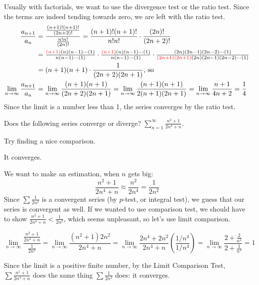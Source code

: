 \begin{solution}
Usually with factorials, we want to use the divergence test or the ratio test. Since the terms are indeed tending towards zero, we are left with the ratio test.
\begin{align*}
\frac{a_{n+1}}{a_n}&=\frac{\frac{(n+1)!(n+1)!}{(2n+2)!}}{\frac{n!n!}{(2n)!}}=\frac{(n+1)!(n+1)!}{n!n!}\cdot\frac{(2n)!}{(2n+2)!}\\
&=\tfrac{\textcolor{red}{(n+1)}{(n)}{(n-1)}\cdots{(1)}}{{n}{(n-1)}\cdots{(1)}}
\cdot\tfrac{\textcolor{red}{(n+1)}{(n)}{(n-1)}\cdots{(1)}}{{n}{(n-1)}\cdots{(1)}}
\cdot
\tfrac{{(2n)}{(2n-1)}{(2n-2)}\cdots{(1)}}{\textcolor{red}{(2n+1)(2n+1)}{(2n)}{(2n-1)}{(2n-2)}\cdots{(1)}}
\\
&=(n+1)(n+1) \cdot \frac{1}{(2n+2)(2n+1)}\mbox{, so}\\
\lim_{n \rightarrow \infty}\frac{a_{n+1}}{a_n}&=\lim_{n \rightarrow \infty}\frac{(n+1)(n+1)}{(2n+2)(2n+1)}
=\lim_{n \rightarrow \infty}\frac{(n+1)(n+1)}{2(n+1)(2n+1)}
=\lim_{n \rightarrow \infty}\frac{n+1}{4n+2}=\frac{1}{4}
\end{align*}
Since the limit is a number less than 1, the series converges by the ratio test.
\end{solution}












\begin{Mquestion}
Does the following series converge or diverge?
$\displaystyle\sum_{n=1}^\infty\frac{n^2+1}{2n^4+n}$.
\end{Mquestion}

\begin{hint}
Try finding a nice comparison.
\end{hint}

\begin{answer}
It converges.
\end{answer}

\begin{solution}
We want to make an estimation, when $n$ gets big:
\[\frac{n^2+1}{2n^4+n} \approx \frac{n^2}{2n^4}=\frac{1}{2n^2}\]
Since $\sum \frac{1}{2n^2}$ is a convergent series (by $p$-test, or integral test), we guess that our series is convergent as well. If we wanted to use comparison test, we should have to show $\frac{n^2+1}{2n^4+n}<\frac{1}{2n^2}$, which seems unpleasant, so let's use limit comparison.

\[\lim_{n \rightarrow \infty}\frac{\frac{n^2+1}{2n^4+n}}{\frac{1}{2n^2}}=\lim_{n \rightarrow \infty}\frac{(n^2+1)2n^2}{2n^4+n}
=\lim_{n \rightarrow \infty}\frac{2n^4+2n^2}{2n^4+n}\left(\frac{1/n^4}{1/n^4}\right)=\lim_{n \rightarrow \infty}\frac{2+\frac{2}{n^2}}{2+\frac{1}{n^3}}=1
\]

Since the limit is a positive finite number, by the Limit Comparison Test, $\sum \frac{n^1+1}{2n^4+n}$ does the same thing $\sum\frac{1}{2n^2}$ does: it converges.
\end{solution}


